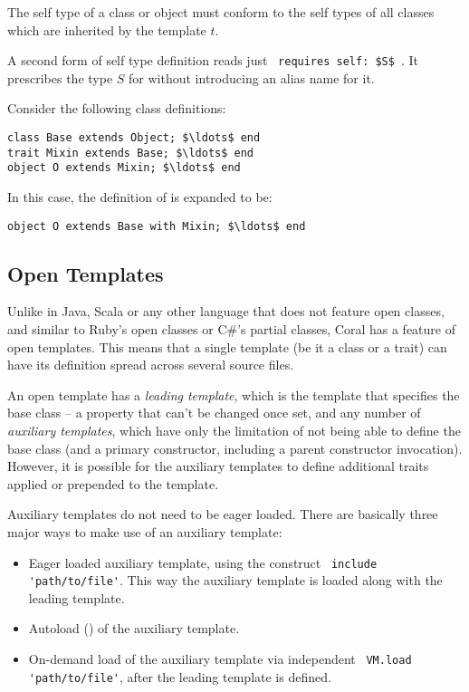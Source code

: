 The self type of a class or object must conform to the self types of all classes which are inherited by the template $t$. 

A second form of self type definition reads just ~\lstinline!requires self: $S$!~. It prescribes the type $S$ for  without introducing an alias name for it. 


\example Consider the following class definitions:
\begin{lstlisting}
class Base extends Object; $\ldots$ end
trait Mixin extends Base; $\ldots$ end
object O extends Mixin; $\ldots$ end
\end{lstlisting}
In this case, the definition of  is expanded to be:
\begin{lstlisting}
object O extends Base with Mixin; $\ldots$ end
\end{lstlisting}





\subsection{Open Templates}
\label{sec:open-templates}

Unlike in Java, Scala or any other language that does not feature open classes, and similar to Ruby's open classes or C\#'s partial classes, Coral has a feature of open templates. This means that a single template (be it a class or a trait) can have its definition spread across several source files. 

An open template has a {\em leading template}, which is the template that specifies the base class -- a property that can't be changed once set, and any number of {\em auxiliary templates}, which have only the limitation of not being able to define the base class (and a primary constructor, including a parent constructor invocation). However, it is possible for the auxiliary templates to define additional traits applied or prepended to the template. 

Auxiliary templates do not need to be eager loaded. There are basically three major ways to make use of an auxiliary template:
\begin{itemize}
\item Eager loaded auxiliary template, using the construct ~\lstinline!include 'path/to/file'!. This way the auxiliary template is loaded along with the leading template.
\item Autoload () of the auxiliary template. 
\item On-demand load of the auxiliary template via independent ~\lstinline!VM.load 'path/to/file'!, after the leading template is defined.  
\end{itemize}

